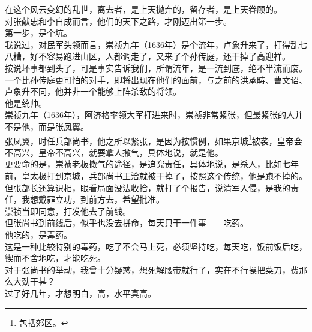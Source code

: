 \begin{multicols}{\theparacolNo}
在这个风云变幻的乱世，离去者，是上天抛弃的，留存者，是上天眷顾的。\\

对张献忠和李自成而言，他们的天下之路，才刚迈出第一步。\\

第一步，是个坑。\\

我说过，对民军头领而言，崇祯九年（1636年）是个流年，卢象升来了，打得乱七八糟，好不容易跑进山区，人都调走了，又来了个孙传庭，还干掉了高迎祥。\\

按说坏事都到头了，可是事实告诉我们，所谓流年，是一流到底，绝不半流而废。\\

一个比孙传庭更可怕的对手，即将出现在他们的面前，与之前的洪承畴、曹文诏、卢象升不同，他并非一个能够上阵杀敌的将领。\\

他是统帅。\\

崇祯九年（1636年），阿济格率领大军打进来时，崇祯非常紧张，但最紧张的人并不是他，而是张凤翼。\\

张凤翼，时任兵部尚书，他之所以紧张，是因为按惯例，如果京城\footnote{包括郊区。}被袭，皇帝会不高兴，皇帝不高兴，就要拿人撒气，具体地说，就是他。\\

更要命的是，崇祯老板撒气的途径，是追究责任，具体地说，是杀人，比如七年前，皇太极打到京城，兵部尚书王洽就被干掉了，按照这个传统，他是跑不掉的。\\

但张部长还算识相，眼看局面没法收拾，就打了个报告，说清军入侵，是我的责任，我想戴罪立功，到前方去，希望批准。\\

崇祯当即同意，打发他去了前线。\\

但张尚书到前线后，似乎也没去拼命，每天只干一件事——吃药。\\

他吃的，是毒药。\\

这是一种比较特别的毒药，吃了不会马上死，必须坚持吃，每天吃，饭前饭后吃，锲而不舍地吃，才能吃死。\\

对于张尚书的举动，我曾十分疑惑，想死解腰带就行了，实在不行操把菜刀，费那么大劲干甚？\\

过了好几年，才想明白，高，水平真高。\\


\end{multicols}
